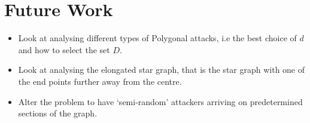 \documentclass[11pt]{beamer}
\begin{document}
\section[]{Future Work}
\hypertarget{Future work}{}
\begin{frame}{\insertsection}

\begin{itemize}
\item Look at analysing different types of Polygonal attacks, i.e the best choice of $d$ and how to select the set $D$.
\item Look at analysing the elongated star graph, that is the star graph with one of the end points further away from the centre.
\item Alter the problem to have `semi-random' attackers arriving on predetermined sections of the graph.
\end{itemize}

\end{frame}
\end{document}
